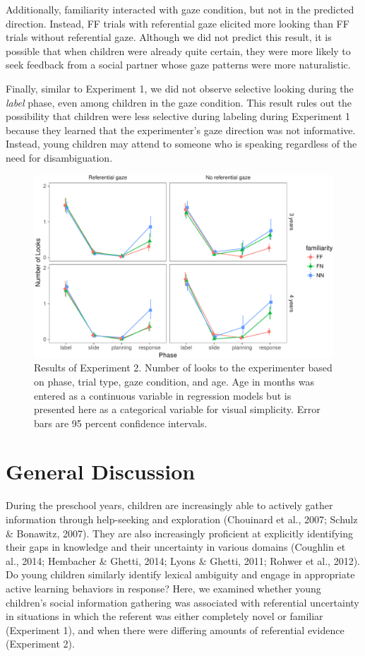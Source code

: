 \documentclass[english,man]{apa6}
\theoremstyle{definition}
\theoremstyle{definition}
\theoremstyle{definition}
\theoremstyle{remark}
\begin{document}
Additionally, familiarity interacted with gaze condition, but not in the
predicted direction. Instead, FF trials with referential gaze elicited
more looking than FF trials without referential gaze. Although we did
not predict this result, it is possible that when children were already
quite certain, they were more likely to seek feedback from a social
partner whose gaze patterns were more naturalistic.

Finally, similar to Experiment 1, we did not observe selective looking
during the \emph{label} phase, even among children in the gaze
condition. This result rules out the possibility that children were less
selective during labeling during Experiment 1 because they learned that
the experimenter's gaze direction was not informative. Instead, young
children may attend to someone who is speaking regardless of the need
for disambiguation.

\begin{figure}
\centering
\includegraphics{figs/resultse2-1.pdf}
\caption{\label{fig:resultse2}Results of Experiment 2. Number of looks to
the experimenter based on phase, trial type, gaze condition, and age.
Age in months was entered as a continuous variable in regression models
but is presented here as a categorical variable for visual simplicity.
Error bars are 95 percent confidence intervals.}
\end{figure}

\section{General Discussion}\label{general-discussion}

During the preschool years, children are increasingly able to actively
gather information through help-seeking and exploration (Chouinard et
al., 2007; Schulz \& Bonawitz, 2007). They are also increasingly
proficient at explicitly identifying their gaps in knowledge and their
uncertainty in various domains (Coughlin et al., 2014; Hembacher \&
Ghetti, 2014; Lyons \& Ghetti, 2011; Rohwer et al., 2012). Do young
children similarly identify lexical ambiguity and engage in appropriate
active learning behaviors in response? Here, we examined whether young
children's social information gathering was associated with referential
uncertainty in situations in which the referent was either completely
novel or familiar (Experiment 1), and when there were differing amounts
of referential evidence (Experiment 2).
\end{document}
